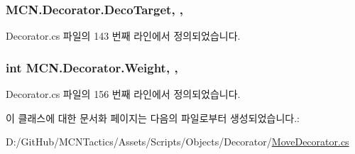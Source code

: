 \subsubsection[{\texorpdfstring{Deco\+Target}{DecoTarget}}]{ M\+C\+N.\+Decorator.\+Deco\+Target\hspace{0.3cm}{\ttfamily [get]}, {\ttfamily [protected]}, {\ttfamily [inherited]}}\hypertarget{class_m_c_n_1_1_decorator_a1306a0a8b814650cd5970a1ffc7ba2fe}{}\label{class_m_c_n_1_1_decorator_a1306a0a8b814650cd5970a1ffc7ba2fe}


Decorator.\+cs 파일의 143 번째 라인에서 정의되었습니다.

\subsubsection[{\texorpdfstring{Weight}{Weight}}]{\setlength{\rightskip}{0pt plus 5cm}int M\+C\+N.\+Decorator.\+Weight\hspace{0.3cm}{\ttfamily [get]}, {\ttfamily [set]}, {\ttfamily [inherited]}}\hypertarget{class_m_c_n_1_1_decorator_a6f6dcca5e0dfb225bcfe2fa73c0ef752}{}\label{class_m_c_n_1_1_decorator_a6f6dcca5e0dfb225bcfe2fa73c0ef752}


Decorator.\+cs 파일의 156 번째 라인에서 정의되었습니다.



이 클래스에 대한 문서화 페이지는 다음의 파일로부터 생성되었습니다.\+:\begin{DoxyCompactItemize}
\item 
D\+:/\+Git\+Hub/\+M\+C\+N\+Tactics/\+Assets/\+Scripts/\+Objects/\+Decorator/\hyperlink{_move_decorator_8cs}{Move\+Decorator.\+cs}\end{DoxyCompactItemize}
